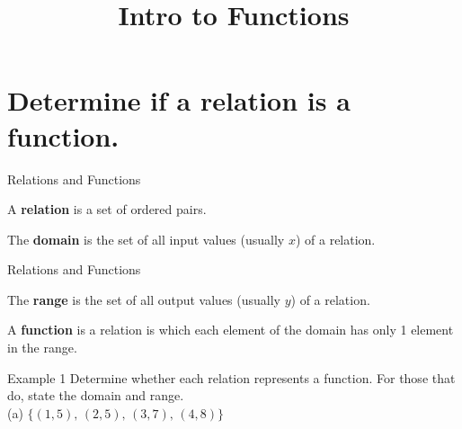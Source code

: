 \documentclass[t]{beamer}
\title{Intro to Functions}
\author{}
\date{}
\begin{document}
\begin{frame} 
\maketitle
\end{frame}

\section{Determine if a relation is a function.}

\begin{frame}{Relations and Functions}
\begin{tcolorbox}[colback=red!15!white, colframe=red!60!black, title=Relations]
A \textbf{relation} is a set of ordered pairs.
\end{tcolorbox}
\vspace{1cm}	\pause

\begin{tcolorbox}[colback=red!15!white, colframe=red!60!black, title=Domain]
The \textbf{domain} is the set of all input values (usually $x$) of a relation.
\end{tcolorbox}
\end{frame}

\begin{frame}{Relations and Functions}
\begin{tcolorbox}[colback=red!15!white, colframe=red!60!black, title=Range]
The \textbf{range} is the set of all output values (usually $y$) of a relation.
\end{tcolorbox}
\vspace{1cm}	\pause
\begin{tcolorbox}[colback=red!15!white, colframe=red!60!black, title=Function]
A \textbf{function} is a relation is which each element of the domain has only 1 element in the range.
\end{tcolorbox}
\end{frame}

\begin{frame}{Example 1}
Determine whether each relation represents a function. For those that do, state the domain and range.	\newline\\
(a) \quad $\{(1,5), \, (2, 5), \, (3, 7), \, (4, 8)\}$	\newline\\	
	\newline\\
 \newline\\
\end{frame}
\end{document}
